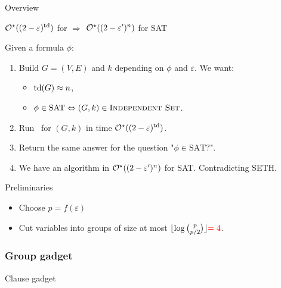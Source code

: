 \begin{frame}{Overview}
    \begin{center}
        $\mathcal{O}^\star((2 - \varepsilon)^{\text{td}})$ for \IS\qquad $\Rightarrow$ \qquad $\mathcal{O}^\star((2 - \varepsilon')^n)$ for SAT
    \end{center}

    \pause

    \vspace{.5cm}

    Given a formula $\phi$:
    \begin{enumerate}
        \item<2-> Build $G = (V, E)$ and $k$ depending on $\phi$ and $\varepsilon$. We want:\begin{itemize}
            \item<3-> $\text{td}(G) \approx n$,
            \item<4-> $\phi \in \text{SAT} \Leftrightarrow (G, k) \in \textsc{Independent Set}$.
        \end{itemize}
        \item<5-> Run \IS\ for $(G, k)$ in time $\mathcal{O}^\star((2 - \varepsilon)^{\text{td}})$.
        \item<6-> Return the same answer for the question "$\phi \in \text{SAT}$?".
        \item<7-> We have an algorithm in $\mathcal{O}^\star((2 - \varepsilon')^n)$ for SAT. Contradicting SETH.
    \end{enumerate}
\end{frame}

\begin{frame}{Preliminaries}
    \begin{itemize}
        \item Choose $p = f(\varepsilon)$ 
        \item<4-> Cut variables into groups of size at most $\lfloor\log\binom{p}{p/2}\rfloor {\color{red} = 4}$.
    \end{itemize}

    \centering

\end{frame}

\begin{frame}
    \frametitle{Group gadget}
    \centering
    
\end{frame}

\begin{frame}{Clause gadget}
    \centering
    
\end{frame}

